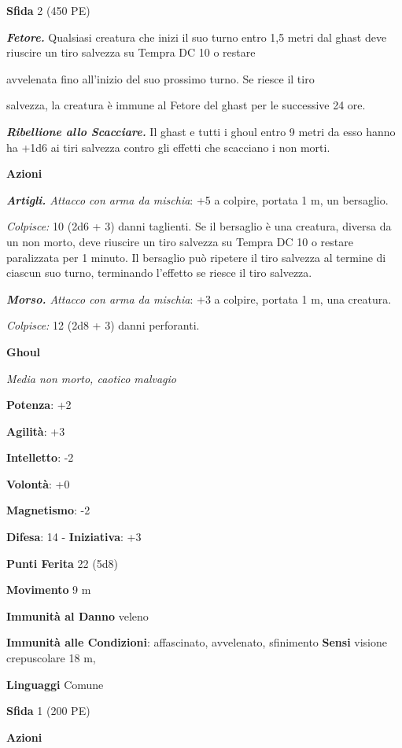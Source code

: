 \begin{multicols}{2}
\textbf{Sfida} 2 (450 PE)\smallskip

\emph{\textbf{Fetore.}} Qualsiasi creatura che inizi il suo turno entro
1,5 metri dal ghast deve riuscire un tiro salvezza su Tempra DC 10
o restare

avvelenata fino all'inizio del suo prossimo turno. Se riesce il tiro

salvezza, la creatura è immune al Fetore del ghast per le successive 24
ore.

\emph{\textbf{Ribellione allo Scacciare.}} Il ghast e tutti i ghoul
entro 9 metri da esso hanno ha +1d6 ai tiri salvezza contro gli
effetti che scacciano i non morti.

\smallskip\textbf{Azioni}

\emph{\textbf{Artigli.} Attacco con arma da mischia}: +5 a colpire,
portata 1 m, un bersaglio.

\emph{Colpisce:} 10 (2d6 + 3) danni taglienti. Se il bersaglio è una
creatura, diversa da un non morto, deve riuscire un tiro salvezza su Tempra DC 10 o restare paralizzata per 1 minuto. Il bersaglio può
ripetere il tiro salvezza al termine di ciascun suo turno, terminando
l'effetto se riesce il tiro salvezza.

\emph{\textbf{Morso.} Attacco con arma da mischia}: +3 a colpire,
portata 1 m, una creatura.

\emph{Colpisce:} 12 (2d8 + 3) danni perforanti.

\textbf{Ghoul}

\emph{Media non morto, caotico malvagio}

\textbf{Potenza}: +2

\textbf{Agilità}: +3

\textbf{Intelletto}: -2

\textbf{Volontà}: +0

\textbf{Magnetismo}: -2

\textbf{Difesa}: 14 - \textbf{Iniziativa}: +3

\textbf{Punti Ferita} 22 (5d8)

\textbf{Movimento} 9 m

\textbf{Immunità al Danno} veleno

\textbf{Immunità alle Condizioni}: affascinato, avvelenato, sfinimento
\textbf{Sensi} visione crepuscolare 18 m, 

\textbf{Linguaggi} Comune

\textbf{Sfida} 1 (200 PE)\smallskip

\smallskip\textbf{Azioni}


\end{multicols}

